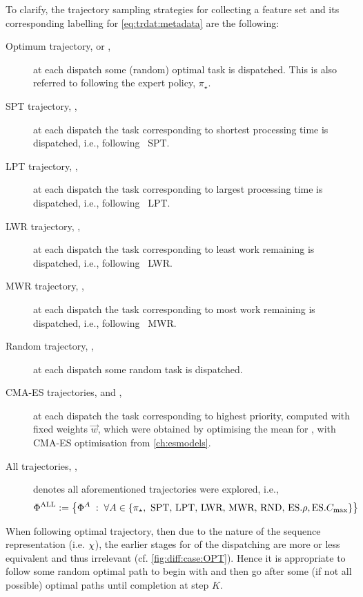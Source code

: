 \clearpage
To clarify, the trajectory sampling strategies for collecting a feature set and 
its corresponding labelling for \cref{eq:trdat:metadata} are the following:
\begin{description}
    \item[Optimum trajectory, \PhiSet{\OPT} or \PhiSet{\pi_\star},] at each 
    dispatch some (random) optimal task is dispatched. This is also referred to 
    following the expert policy, $\pi_\star$.
    \item[SPT trajectory, \PhiSet{\SPT},] at each dispatch the task 
    corresponding to shortest processing time is dispatched, i.e., following 
    \sdr~SPT.
    \item[LPT trajectory, \PhiSet{\LPT},] at each dispatch the task 
    corresponding to largest processing time is dispatched, i.e., following 
    \sdr~LPT.
    \item[LWR trajectory, \PhiSet{\LWR},] at each dispatch the task 
    corresponding to least work remaining is dispatched, i.e., following 
    \sdr~LWR.
    \item[MWR trajectory, \PhiSet{\MWR},] at each dispatch the task 
    corresponding to most work remaining is dispatched, i.e., following 
    \sdr~MWR.
    \item[Random trajectory, \PhiSet{\RND},] at each dispatch some random task 
    is dispatched.
    \item[CMA-ES trajectories, \PhiSet{\minRho} and \PhiSet{\minCmax},] at each 
    dispatch the task  corresponding to highest priority, computed with fixed 
    weights $\vec{w}$, which were obtained by optimising the mean for 
    \fullnamerho, with CMA-ES optimisation from \cref{ch:esmodels}. 
    \item[All trajectories, \PhiSet{\ALL},] denotes all aforementioned 
    trajectories were explored, i.e., \vspace*{-18pt}
    \begin{equation} \nonumber
    \Phi^{\text{ALL}}:=\left\{\Phi^{A}\;:\;\forall A \in 
    \left\{\pi_\star,\text{~SPT,~LPT,~LWR,~MWR,~RND,~}\text{ES}.{\rho},\text{ES}.{C_{\max}}\right\}\right\}
    \end{equation}
\end{description}

When following optimal trajectory, then due to the nature of the sequence 
representation (i.e. ${\mathbf{\chi}}$), the earlier stages for  of the 
dispatching are more or less equivalent and thus irrelevant (cf. 
\cref{fig:diff:case:OPT}). 
Hence it is appropriate to follow some random optimal path to begin with and 
then go after some (if not all possible) optimal paths until completion at step 
$K$. 

